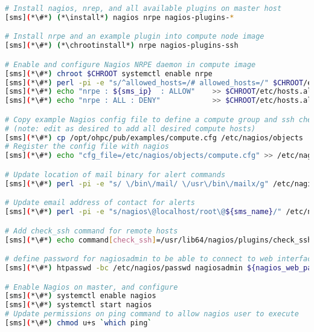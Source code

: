 \begin{lstlisting}[language=bash,keywords={},upquote=true]
# Install nagios, nrep, and all available plugins on master host
[sms](*\#*) (*\install*) nagios nrpe nagios-plugins-*

# Install nrpe and an example plugin into compute node image
[sms](*\#*) (*\chrootinstall*) nrpe nagios-plugins-ssh

# Enable and configure Nagios NRPE daemon in compute image 
[sms](*\#*) chroot $CHROOT systemctl enable nrpe
[sms](*\#*) perl -pi -e "s/^allowed_hosts=/# allowed_hosts=/" $CHROOT/etc/nagios/nrpe.cfg
[sms](*\#*) echo "nrpe : ${sms_ip}  : ALLOW"    >> $CHROOT/etc/hosts.allow
[sms](*\#*) echo "nrpe : ALL : DENY"            >> $CHROOT/etc/hosts.allow

# Copy example Nagios config file to define a compute group and ssh check
# (note: edit as desired to add all desired compute hosts)
[sms](*\#*) cp /opt/ohpc/pub/examples/compute.cfg /etc/nagios/objects
# Register the config file with nagios
[sms](*\#*) echo "cfg_file=/etc/nagios/objects/compute.cfg" >> /etc/nagios/nagios.cfg

# Update location of mail binary for alert commands
[sms](*\#*) perl -pi -e "s/ \/bin\/mail/ \/usr\/bin\/mailx/g" /etc/nagios/objects/commands.cfg

# Update email address of contact for alerts
[sms](*\#*) perl -pi -e "s/nagios\@localhost/root\@${sms_name}/" /etc/nagios/objects/contacts.cfg

# Add check_ssh command for remote hosts
[sms](*\#*) echo command[check_ssh]=/usr/lib64/nagios/plugins/check_ssh localhost $CHROOT/etc/nagios/nrpe.cfg

# define password for nagiosadmin to be able to connect to web interface
[sms](*\#*) htpasswd -bc /etc/nagios/passwd nagiosadmin ${nagios_web_password}

# Enable Nagios on master, and configure
[sms](*\#*) systemctl enable nagios
[sms](*\#*) systemctl start nagios
# Update permissions on ping command to allow nagios user to execute
[sms](*\#*) chmod u+s `which ping`
\end{lstlisting}


